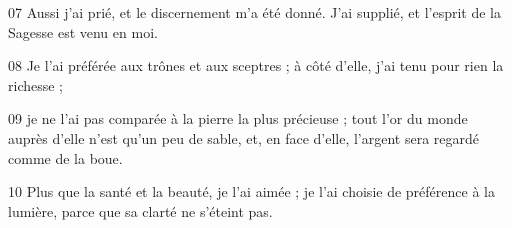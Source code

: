 
07 Aussi j’ai prié, et le discernement m’a été donné. J’ai supplié, et l’esprit de la Sagesse est venu en moi.

08 Je l’ai préférée aux trônes et aux sceptres ; à côté d’elle, j’ai tenu pour rien la richesse ;

09 je ne l’ai pas comparée à la pierre la plus précieuse ; tout l’or du monde auprès d’elle n’est qu’un peu de sable, et, en face d’elle, l’argent sera regardé comme de la boue.

10 Plus que la santé et la beauté, je l’ai aimée ; je l’ai choisie de préférence à la lumière, parce que sa clarté ne s’éteint pas.
